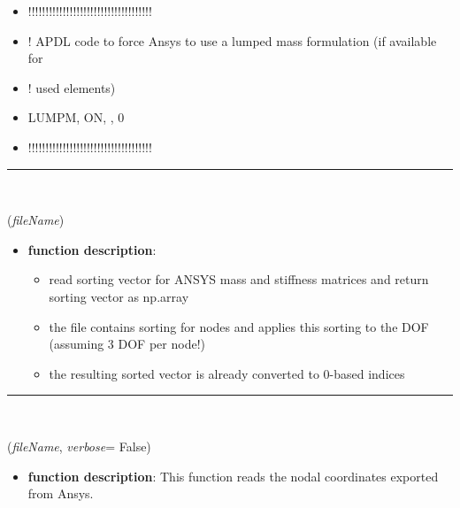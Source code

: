 \begin{itemize}[leftmargin=1.4cm]
\begin{itemize}[leftmargin=1.4cm]
\begin{itemize}[leftmargin=1.4cm]
\begin{itemize}[leftmargin=0.5cm]
\begin{itemize}[leftmargin=1.4cm]
\begin{itemize}[leftmargin=1.4cm]
\begin{itemize}[leftmargin=1.4cm]
\begin{itemize}[leftmargin=0.5cm]
\begin{itemize}[leftmargin=0.7cm]
\begin{itemize}[leftmargin=1.2cm]
\item[]!!!!!!!!!!!!!!!!!!!!!!!!!!!!!!!!!!!!
\item[]! APDL code to force Ansys to use a lumped mass formulation (if available for
\item[]! used elements)
\item[]LUMPM, ON, , 0
\item[]!!!!!!!!!!!!!!!!!!!!!!!!!!!!!!!!!!!!
\end{itemize}
\vspace{12pt}\end{itemize}
%
\noindent\rule{8cm}{0.75pt}\vspace{1pt} \\ 
\begin{flushleft}
\label{sec:FEM:ReadMatrixDOFmappingVectorFromAnsysTxt}
({\it fileName})
\end{flushleft}
\setlength{\itemindent}{0.7cm}
\begin{itemize}[leftmargin=0.7cm]
\item[--]
{\bf function description}: \vspace{-6pt}
\begin{itemize}[leftmargin=1.2cm]
\setlength{\itemindent}{-0.7cm}
\item[]read sorting vector for ANSYS mass and stiffness matrices and return sorting vector as np.array
\item[]the file contains sorting for nodes and applies this sorting to the DOF (assuming 3 DOF per node!)
\item[]the resulting sorted vector is already converted to 0-based indices
\end{itemize}
\vspace{12pt}\end{itemize}
%
\noindent\rule{8cm}{0.75pt}\vspace{1pt} \\ 
\begin{flushleft}
\label{sec:FEM:ReadNodalCoordinatesFromAnsysTxt}
({\it fileName}, {\it verbose}= False)
\end{flushleft}
\setlength{\itemindent}{0.7cm}
\begin{itemize}[leftmargin=0.7cm]
\item[--]
{\bf function description}: This function reads the nodal coordinates exported from Ansys.

\end{itemize}
\end{itemize}
\end{itemize}
\end{itemize}
\end{itemize}
\end{itemize}
\end{itemize}
\end{itemize}
\end{itemize}
